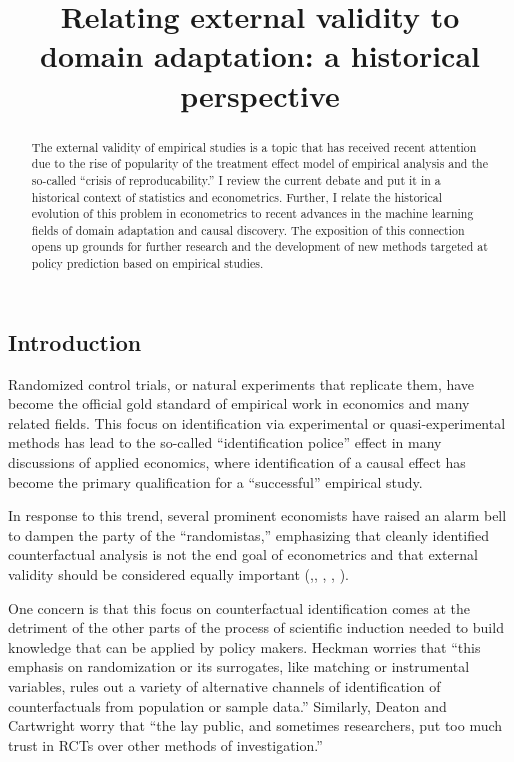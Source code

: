 \documentclass[a4paper,12pt]{article}
\begin{document}
\title{Relating external validity to domain adaptation: a historical perspective}

\begin{abstract}
The external validity of empirical studies is a topic that has received recent attention due to the rise of popularity of the treatment effect model of empirical analysis and the so-called ``crisis of reproducability.'' I review the current debate and put it in a historical context of statistics and econometrics. Further, I relate the historical evolution of this problem in econometrics to recent advances in the machine learning fields of domain adaptation and causal discovery. The exposition of this connection opens up grounds for further research and the development of new methods targeted at policy prediction based on empirical studies.
\end{abstract}



\subsection*{Introduction}

Randomized control trials, or natural experiments that replicate them, have become the official gold standard of empirical work in economics and many related fields. This focus on identification via experimental or quasi-experimental methods has lead to the so-called ``identification police'' effect in many discussions of applied economics, where identification of a causal effect has become the primary qualification for a ``successful'' empirical study.

In response to this trend, several prominent economists have raised an alarm bell to dampen the party of the ``randomistas,'' emphasizing that cleanly identified counterfactual analysis is not the end goal of econometrics and that external validity should be considered equally important (\cite{Shadish2002},\cite{Heckman2008}, \cite{Deaton2010}, \cite{Manski2013}, \cite{Deaton2018}).

One concern is that this focus on counterfactual identification comes at the detriment of the other parts of the process of scientific induction needed to build knowledge that can be applied by policy makers. Heckman \parencite*{Heckman2008} worries that ``this emphasis on randomization or its surrogates, like matching or instrumental variables, rules out a variety of alternative channels of identification of counterfactuals from population or sample data.'' Similarly, Deaton and Cartwright \parencite*{Deaton2018} worry that ``the lay public, and sometimes researchers, put too much trust in RCTs over other methods of investigation.''
\end{document}
